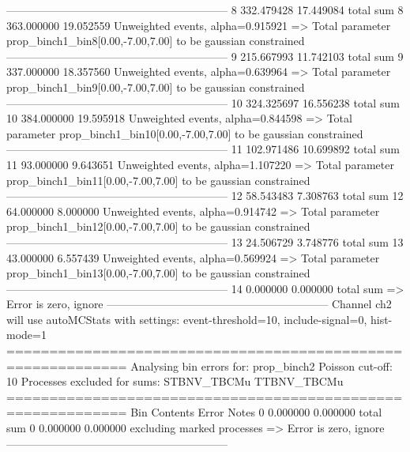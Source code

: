 ------------------------------------------------------------
8          332.479428      17.449084       total sum                     
8          363.000000      19.052559       Unweighted events, alpha=0.915921
  => Total parameter prop_binch1_bin8[0.00,-7.00,7.00] to be gaussian constrained
------------------------------------------------------------
9          215.667993      11.742103       total sum                     
9          337.000000      18.357560       Unweighted events, alpha=0.639964
  => Total parameter prop_binch1_bin9[0.00,-7.00,7.00] to be gaussian constrained
------------------------------------------------------------
10         324.325697      16.556238       total sum                     
10         384.000000      19.595918       Unweighted events, alpha=0.844598
  => Total parameter prop_binch1_bin10[0.00,-7.00,7.00] to be gaussian constrained
------------------------------------------------------------
11         102.971486      10.699892       total sum                     
11         93.000000       9.643651        Unweighted events, alpha=1.107220
  => Total parameter prop_binch1_bin11[0.00,-7.00,7.00] to be gaussian constrained
------------------------------------------------------------
12         58.543483       7.308763        total sum                     
12         64.000000       8.000000        Unweighted events, alpha=0.914742
  => Total parameter prop_binch1_bin12[0.00,-7.00,7.00] to be gaussian constrained
------------------------------------------------------------
13         24.506729       3.748776        total sum                     
13         43.000000       6.557439        Unweighted events, alpha=0.569924
  => Total parameter prop_binch1_bin13[0.00,-7.00,7.00] to be gaussian constrained
------------------------------------------------------------
14         0.000000        0.000000        total sum                     
  => Error is zero, ignore      
------------------------------------------------------------
Channel ch2 will use autoMCStats with settings: event-threshold=10, include-signal=0, hist-mode=1
============================================================
Analysing bin errors for: prop_binch2
Poisson cut-off: 10
Processes excluded for sums: STBNV_TBCMu TTBNV_TBCMu
============================================================
Bin        Contents        Error           Notes                         
0          0.000000        0.000000        total sum                     
0          0.000000        0.000000        excluding marked processes    
  => Error is zero, ignore      
------------------------------------------------------------
